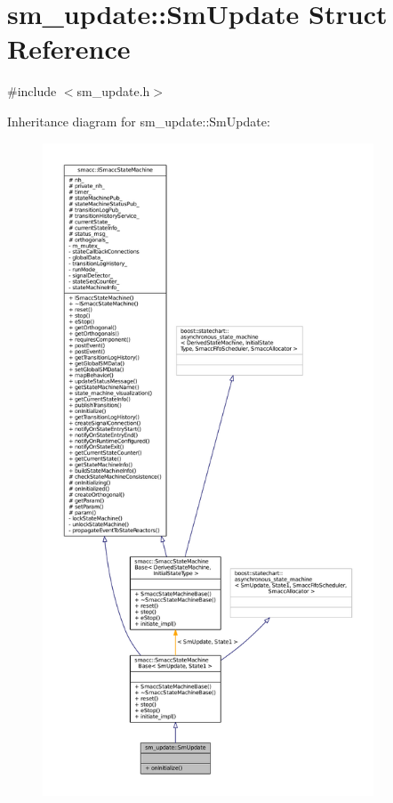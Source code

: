 \hypertarget{structsm__update_1_1SmUpdate}{}\section{sm\+\_\+update\+:\+:Sm\+Update Struct Reference}
\label{structsm__update_1_1SmUpdate}


{\ttfamily \#include $<$sm\+\_\+update.\+h$>$}



Inheritance diagram for sm\+\_\+update\+:\+:Sm\+Update\+:
\nopagebreak
\begin{figure}[H]
\begin{center}
\leavevmode
\includegraphics[height=550pt]{structsm__update_1_1SmUpdate__inherit__graph}
\end{center}
\end{figure}


